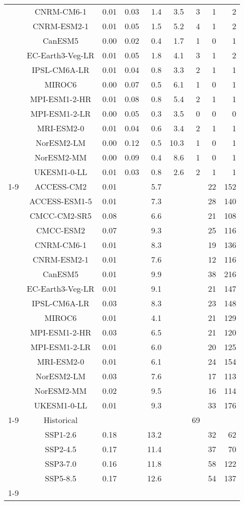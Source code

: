\begin{table*}[t]
\begin{tabular}{c|c|rr|rr|rrr}
 & CNRM-CM6-1 & 0.01 & 0.03 & 1.4 & 3.5 & 3 & 1 & 2 \\
 & CNRM-ESM2-1 & 0.01 & 0.05 & 1.5 & 5.2 & 4 & 1 & 2 \\
 & CanESM5 & 0.00 & 0.02 & 0.4 & 1.7 & 1 & 0 & 1 \\
 & EC-Earth3-Veg-LR & 0.01 & 0.05 & 1.8 & 4.1 & 3 & 1 & 2 \\
 & IPSL-CM6A-LR & 0.01 & 0.04 & 0.8 & 3.3 & 2 & 1 & 1 \\
 & MIROC6 & 0.00 & 0.07 & 0.5 & 6.1 & 1 & 0 & 1 \\
 & MPI-ESM1-2-HR & 0.01 & 0.08 & 0.8 & 5.4 & 2 & 1 & 1 \\
 & MPI-ESM1-2-LR & 0.00 & 0.05 & 0.3 & 3.5 & 0 & 0 & 0 \\
 & MRI-ESM2-0 & 0.01 & 0.04 & 0.6 & 3.4 & 2 & 1 & 1 \\
 & NorESM2-LM & 0.00 & 0.12 & 0.5 & 10.3 & 1 & 0 & 1 \\
 & NorESM2-MM & 0.00 & 0.09 & 0.4 & 8.6 & 1 & 0 & 1 \\
 & UKESM1-0-LL & 0.01 & 0.03 & 0.8 & 2.6 & 2 & 1 & 1 \\
\cline{1-9}
\multirow[c]{16}{*}{Scenario uncertainty} & ACCESS-CM2 & 0.01 &  & 5.7 &  &  & 22 & 152 \\
 & ACCESS-ESM1-5 & 0.01 &  & 7.3 &  &  & 28 & 140 \\
 & CMCC-CM2-SR5 & 0.08 &  & 6.6 &  &  & 21 & 108 \\
 & CMCC-ESM2 & 0.07 &  & 9.3 &  &  & 25 & 116 \\
 & CNRM-CM6-1 & 0.01 &  & 8.3 &  &  & 19 & 136 \\
 & CNRM-ESM2-1 & 0.01 &  & 7.6 &  &  & 12 & 116 \\
 & CanESM5 & 0.01 &  & 9.9 &  &  & 38 & 216 \\
 & EC-Earth3-Veg-LR & 0.01 &  & 9.1 &  &  & 21 & 147 \\
 & IPSL-CM6A-LR & 0.03 &  & 8.3 &  &  & 23 & 148 \\
 & MIROC6 & 0.01 &  & 4.1 &  &  & 21 & 129 \\
 & MPI-ESM1-2-HR & 0.03 &  & 6.5 &  &  & 21 & 120 \\
 & MPI-ESM1-2-LR & 0.01 &  & 6.0 &  &  & 20 & 125 \\
 & MRI-ESM2-0 & 0.01 &  & 6.1 &  &  & 24 & 154 \\
 & NorESM2-LM & 0.03 &  & 7.6 &  &  & 17 & 113 \\
 & NorESM2-MM & 0.02 &  & 9.5 &  &  & 16 & 114 \\
 & UKESM1-0-LL & 0.01 &  & 9.3 &  &  & 33 & 176 \\
\cline{1-9}
\multirow[c]{5}{*}{Model uncertainty} & Historical &  &  &  &  & 69 &  &  \\
 & SSP1-2.6 & 0.18 &  & 13.2 &  &  & 32 & 62 \\
 & SSP2-4.5 & 0.17 &  & 11.4 &  &  & 37 & 70 \\
 & SSP3-7.0 & 0.16 &  & 11.8 &  &  & 58 & 122 \\
 & SSP5-8.5 & 0.17 &  & 12.6 &  &  & 54 & 137 \\
\cline{1-9}
\bottomrule
\end{tabular}
\end{table*}
